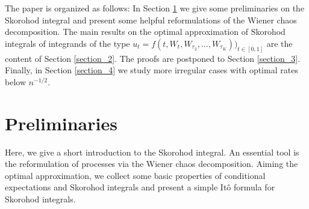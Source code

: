 \documentclass[a4paper,11pt,reqno]{amsart}
\theoremstyle{plain}
\numberwithin{equation}{section}
\begin{document}
The paper is organized as follows: In Section \ref{section_1} we give some preliminaries on the Skorohod integral and present some helpful reformulations of the Wiener chaos decomposition. The main results on the optimal approximation of Skorohod integrals of integrands of the type $u_{t}= f(t, W_{t}, W_{\tau_2},\ldots, W_{\tau_K}))_{t \in [0,1]}$
 are the content of Section \ref{section_2}. The proofs are postponed to Section \ref{section_3}. Finally, in Section \ref{section_4} we study more irregular cases with optimal rates below $n^{-1/2}$.




\section{Preliminaries}\label{section_1}

Here, we give a short introduction to the Skorohod integral. An essential tool is the reformulation of processes via the Wiener chaos decomposition. Aiming the optimal approximation, we collect some basic properties of conditional expectations and Skorohod integrals and present a simple It\^o formula for Skorohod integrals. 
\end{document}

